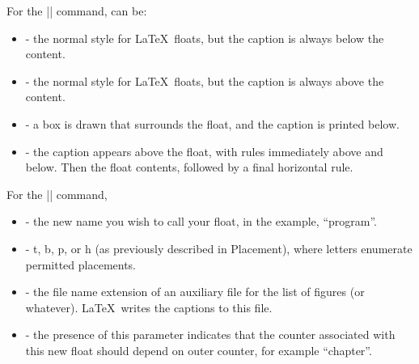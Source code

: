 \begin{frame}[fragile]

For the \LC|\floatstyle| command,  can be:
\begin{itemize}
\item {} - the normal style for \LaTeX\ floats, but the caption is always below the content.
\item {} - the normal style for \LaTeX\ floats, but the caption is always above the content.
\item {} -  a box is drawn that surrounds the float, and the caption is printed below.
\item {} - the caption appears above the float, with rules immediately above and below. Then the float contents, followed by a final horizontal rule.
\end{itemize}

For the \LC|\newfloat| command, 
\begin{itemize}
\item {} - the new name you wish to call your float, in the example, ``program''.
\item {} - t, b, p, or h (as previously described in Placement), where letters enumerate permitted placements.
\item {} -  the file name extension of an auxiliary file for the list of figures (or whatever). \LaTeX\ writes the captions to this file.
\item {} - the presence of this parameter indicates that the counter associated with this new float should depend on outer counter, for example ``chapter''.
\end{itemize}


\end{frame}

\begin{frame}[fragile]

\begin{example}
\end{example}

\end{frame}

